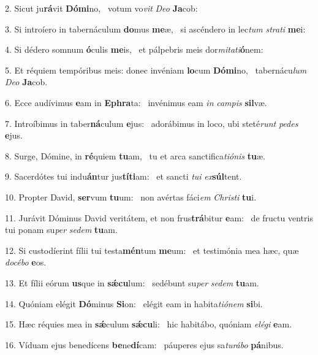 2. Sicut ju\textbf{rá}vit \textbf{Dó}\textbf{mi}no, \ast\  votum vo\textit{vit} \textit{De}\textit{o} \textbf{Ja}cob:\

3. Si introíero in tabernáculum \textbf{do}mus \textbf{me}æ, \ast\  si ascéndero in lec\textit{tum} \textit{stra}\textit{ti} \textbf{me}i:\

4. Si dédero somnum \textbf{ó}culis \textbf{me}is, \ast\  et pálpebris meis dor\textit{mi}\textit{ta}\textit{ti}\textbf{ó}nem:\

5. Et réquiem tempóribus meis: donec invéniam \textbf{lo}cum \textbf{Dó}\textbf{mi}no, \ast\  tabernácu\textit{lum} \textit{De}\textit{o} \textbf{Ja}cob.\

6. Ecce audívimus \textbf{e}am in \textbf{E}\textbf{phra}ta: \ast\  invénimus eam \textit{in} \textit{cam}\textit{pis} \textbf{sil}væ.\

7. Introíbimus in taber\textbf{ná}culum \textbf{e}jus: \ast\  adorábimus in loco, ubi steté\textit{runt} \textit{pe}\textit{des} \textbf{e}jus.\

8. Surge, Dómine, in \textbf{ré}quiem \textbf{tu}am, \ast\  tu et arca sanctifica\textit{ti}\textit{ó}\textit{nis} \textbf{tu}æ.\

9. Sacerdótes tui indu\textbf{án}tur jus\textbf{tí}\textbf{ti}am: \ast\  et sancti \textit{tu}\textit{i} \textit{ex}\textbf{súl}tent.\

10. Propter David, \textbf{ser}vum \textbf{tu}um: \ast\  non avértas fáci\textit{em} \textit{Chris}\textit{ti} \textbf{tu}i.\

11. Jurávit Dóminus David veritátem, et non frus\textbf{trá}bitur \textbf{e}am: \ast\  de fructu ventris tui ponam su\textit{per} \textit{se}\textit{dem} \textbf{tu}am.\

12. Si custodíerint fílii tui testa\textbf{mén}tum \textbf{me}um: \ast\  et testimónia mea hæc, quæ \textit{do}\textit{cé}\textit{bo} \textbf{e}os.\

13. Et fílii eórum \textbf{us}que in \textbf{sǽ}\textbf{cu}lum: \ast\  sedébunt su\textit{per} \textit{se}\textit{dem} \textbf{tu}am.\

14. Quóniam elégit \textbf{Dó}minus \textbf{Si}on: \ast\  elégit eam in habita\textit{ti}\textit{ó}\textit{nem} \textbf{si}bi.\

15. Hæc réquies mea in \textbf{sǽ}culum \textbf{sǽ}\textbf{cu}li: \ast\  hic habitábo, quóniam \textit{e}\textit{lé}\textit{gi} \textbf{e}am.\

16. Víduam ejus benedícens \textbf{be}ne\textbf{dí}cam: \ast\  páuperes ejus sa\textit{tu}\textit{rá}\textit{bo} \textbf{pá}nibus.\

